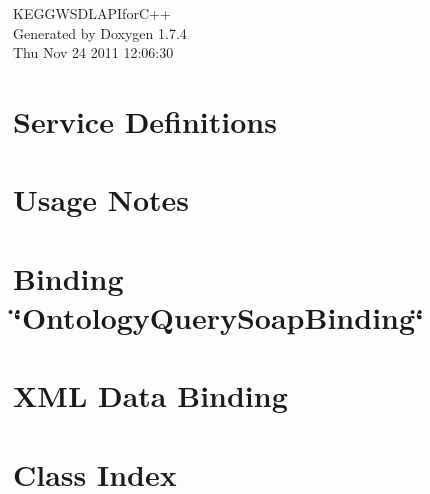 \documentclass[a4paper]{book}
\begin{document}
\hypersetup{pageanchor=false}
\begin{titlepage}
\vspace*{7cm}
\begin{center}
{\Large KEGGWSDLAPIforC++ }\\
\vspace*{1cm}
{\large Generated by Doxygen 1.7.4}\\
\vspace*{0.5cm}
{\small Thu Nov 24 2011 12:06:30}\\
\end{center}
\end{titlepage}
\clearemptydoublepage
{}
\tableofcontents
\clearemptydoublepage
{}
\hypersetup{pageanchor=true}
\chapter{Service Definitions}
\label{index}\hypertarget{index}{}
\chapter{Usage Notes}
\label{page_notes}
\hypertarget{page_notes}{}

\chapter{Binding \char`\"{}OntologyQuerySoapBinding\char`\"{}}
\label{OntologyQuerySoapBinding}
\hypertarget{OntologyQuerySoapBinding}{}

\chapter{XML Data Binding}
\label{page_XMLDataBinding}
\hypertarget{page_XMLDataBinding}{}

\chapter{Class Index}

\end{document}
